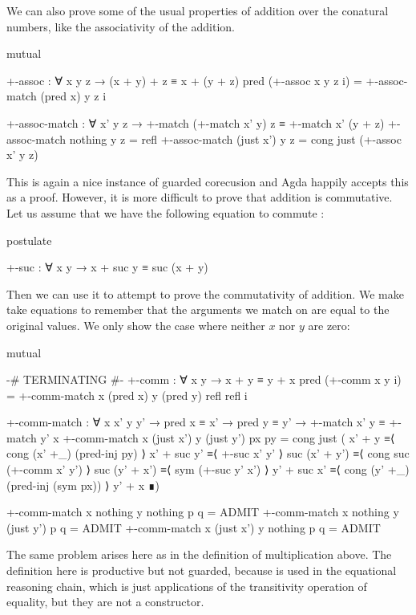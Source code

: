We can also prove some of the usual properties of addition over the conatural
numbers, like the associativity of the addition.
\begin{code}[hide]
mutual
\end{code}
\begin{code}
  +-assoc : ∀ x y z → (x + y) + z ≡ x + (y + z)
  pred (+-assoc x y z i) = +-assoc-match (pred x) y z i

  +-assoc-match :
    ∀ x' y z →
    +-match (+-match x' y) z ≡ +-match x' (y + z)
  +-assoc-match nothing    y z = refl
  +-assoc-match (just x')  y z = cong just (+-assoc x' y z)
\end{code}
This is again a nice instance of guarded corecusion and Agda happily accepts
this as a proof. However, it is more difficult to prove that addition is
commutative. Let us assume that we have the following equation to commute
:
\begin{code}[hide]
postulate
\end{code}
\begin{code}
  +-suc : ∀ x y → x + suc y ≡ suc (x + y)
\end{code}
Then we can use it to attempt to prove the commutativity of addition. We make
 take equations to remember that the arguments we
match on are equal to the original values. We only show the case where neither
$x$ nor $y$ are zero:
\begin{code}[hide]
mutual
\end{code}
\begin{code}
  {-# TERMINATING #-}
  +-comm : ∀ x y → x + y ≡ y + x
  pred (+-comm x y i) =
    +-comm-match x (pred x) y (pred y) refl refl i

  +-comm-match :
    ∀ x x' y y' → pred x ≡ x' → pred y ≡ y' →
    +-match x' y ≡ +-match y' x
  +-comm-match x (just x') y (just y') px py =
    cong just
      (  x' + y         ≡⟨ cong (x' +_) (pred-inj py) ⟩
         x' + suc y'    ≡⟨ +-suc x' y' ⟩
         suc (x' + y')  ≡⟨ cong suc (+-comm x' y') ⟩
         suc (y' + x')  ≡⟨ sym (+-suc y' x') ⟩
         y' + suc x'    ≡⟨ cong (y' +_) (pred-inj (sym px)) ⟩
         y' + x         ∎)
\end{code}
\begin{code}[hide]
  +-comm-match x nothing y nothing p q = ADMIT
  +-comm-match x nothing y (just y') p q = ADMIT
  +-comm-match x (just x') y nothing p q = ADMIT
\end{code}
The same problem arises here as in the definition of multiplication above. The
definition here is productive but not guarded, because  is
used in the equational reasoning chain, which is just applications of the
transitivity operation of equality, but they are not a constructor.
